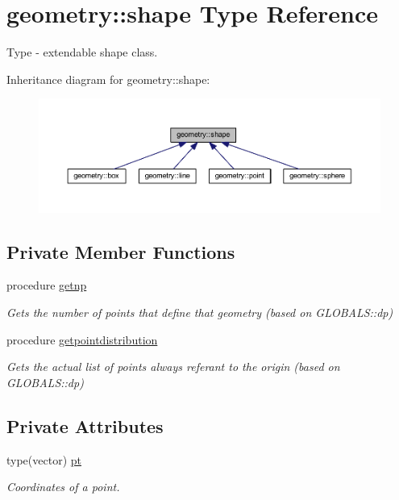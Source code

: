 \hypertarget{structgeometry_1_1shape}{}\section{geometry\+:\+:shape Type Reference}
\label{structgeometry_1_1shape}


Type -\/ extendable shape class.  




Inheritance diagram for geometry\+:\+:shape\+:\nopagebreak
\begin{figure}[H]
\begin{center}
\leavevmode
\includegraphics[width=350pt]{structgeometry_1_1shape__inherit__graph}
\end{center}
\end{figure}
\subsection*{Private Member Functions}
\begin{DoxyCompactItemize}
\item 
procedure \mbox{\hyperlink{structgeometry_1_1shape_ad661871b6433bc48b165c400524dde90}{getnp}}
\begin{DoxyCompactList}\small\item\em Gets the number of points that define that geometry (based on G\+L\+O\+B\+A\+L\+S\+::dp) \end{DoxyCompactList}\item 
procedure \mbox{\hyperlink{structgeometry_1_1shape_a9df712486b716b472955c14057eab7ff}{getpointdistribution}}
\begin{DoxyCompactList}\small\item\em Gets the actual list of points always referant to the origin (based on G\+L\+O\+B\+A\+L\+S\+::dp) \end{DoxyCompactList}\end{DoxyCompactItemize}
\subsection*{Private Attributes}
\begin{DoxyCompactItemize}
\item 
type(vector) \mbox{\hyperlink{structgeometry_1_1shape_aada595aa3503cf22350737caf2931e6a}{pt}}
\begin{DoxyCompactList}\small\item\em Coordinates of a point. \end{DoxyCompactList}\end{DoxyCompactItemize}


